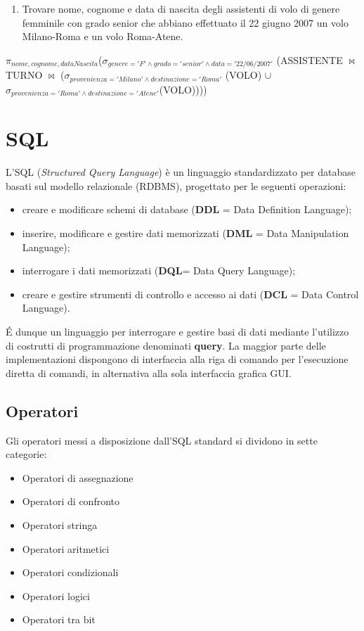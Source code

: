 \documentclass[a4paper]{article}
\begin{document}
\begin{enumerate}
  \item Trovare nome, cognome e data di nascita degli assistenti di volo di genere femminile con grado senior che abbiano effettuato il 22 giugno 2007 un volo Milano-Roma e un volo Roma-Atene.
\end{enumerate}

\begin{mybox}{}
$\pi_{nome, cognome, dataNascita}$($\sigma_{genere='F' \land grado='senior' \land data='22/06/2007'}$ (ASSISTENTE $\Join$ TURNO $\Join$ ($\sigma_{provenienza='Milano' \land destinazione='Roma'}$ (VOLO) $\cup$ $\sigma_{provenienza='Roma' \land destinazione='Atene'}$(VOLO))))
\end{mybox}


\section{SQL}
L'SQL (\emph{Structured Query Language}) è un linguaggio standardizzato per database basati sul modello relazionale (RDBMS), progettato per le seguenti operazioni:
\begin{itemize}
  \item creare e modificare schemi di database (\textbf{DDL} = Data Definition Language);
  \item inserire, modificare e gestire dati memorizzati (\textbf{DML} = Data Manipulation Language);
  \item interrogare i dati memorizzati (\textbf{DQL}= Data Query Language);
  \item creare e gestire strumenti di controllo e accesso ai dati (\textbf{DCL} = Data Control Language).
\end{itemize}
%
É dunque un linguaggio per interrogare e gestire basi di dati mediante l'utilizzo di costrutti di programmazione denominati \textbf{query}. La maggior parte delle implementazioni dispongono di interfaccia alla riga di comando per l'esecuzione diretta di comandi, in alternativa alla sola interfaccia grafica GUI.

\subsection{Operatori}
Gli operatori messi a disposizione dall'SQL standard si dividono in sette categorie:
\begin{itemize}[noitemsep]
  \item Operatori di assegnazione
  \item Operatori di confronto
  \item Operatori stringa
  \item Operatori aritmetici
  \item Operatori condizionali
  \item Operatori logici
  \item Operatori tra bit
\end{itemize}
\end{document}
